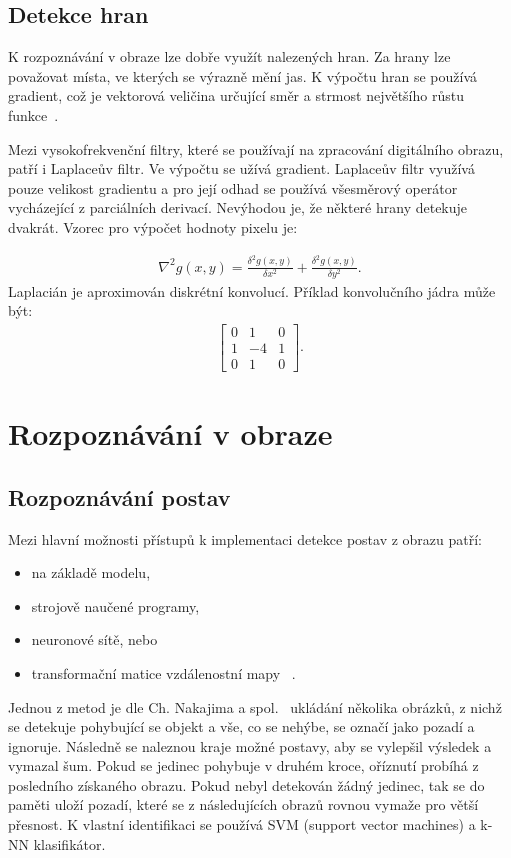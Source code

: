 \subsection{Detekce hran}
K rozpoznávání v obraze lze dobře využít nalezených hran. Za hrany lze považovat místa, ve kterých se výrazně mění jas. K výpočtu hran se používá gradient, což je vektorová veličina určující směr a strmost největšího růstu funkce~\cite{hlav}.

Mezi vysokofrekvenční filtry, které se používají na zpracování digitálního obrazu, patří i Laplaceův filtr. Ve výpočtu se užívá gradient. Laplaceův filtr využívá pouze velikost gradientu a pro její odhad se používá všesměrový operátor vycházející z parciálních derivací. Nevýhodou je, že některé hrany detekuje dvakrát.  Vzorec pro výpočet hodnoty pixelu je:

\begin{eqnarray}
\nabla^{2}g(x,y) = \frac{\delta^{2}g(x,y)}{\delta x^{2}} + \frac{\delta^{2}g(x,y)}{\delta y^{2}}.
\end{eqnarray} 
Laplacián je aproximován diskrétní konvolucí. Příklad konvolučního jádra může být:
\begin{eqnarray}
\begin{bmatrix}
0 & 1 & 0 \\
1 & -4 & 1 \\
0 & 1 & 0
\end{bmatrix}.
\end{eqnarray} 

\section{Rozpoznávání v obraze}
\label{rozpoznavani}
\subsection{Rozpoznávání postav}
Mezi hlavní možnosti přístupů k implementaci detekce postav z obrazu patří:
\begin{itemize}
\item na základě modelu,
\item strojově naučené programy,
\item neuronové sítě, nebo %
\item transformační matice vzdálenostní mapy ~\cite{Cham}.\\
\end{itemize}

Jednou z metod je dle Ch. Nakajima a spol.~\cite{6} ukládání několika obrázků, z nichž se detekuje pohybující se objekt a vše, co se nehýbe, se označí jako pozadí a ignoruje. Následně se naleznou kraje možné postavy, aby se vylepšil výsledek a vymazal šum. Pokud se jedinec pohybuje v druhém kroce, oříznutí probíhá z posledního získaného obrazu. Pokud nebyl detekován žádný jedinec, tak se do paměti uloží pozadí, které se z následujících obrazů rovnou vymaže pro větší přesnost. K vlastní identifikaci se používá SVM (support vector machines) a k-NN klasifikátor.\\

